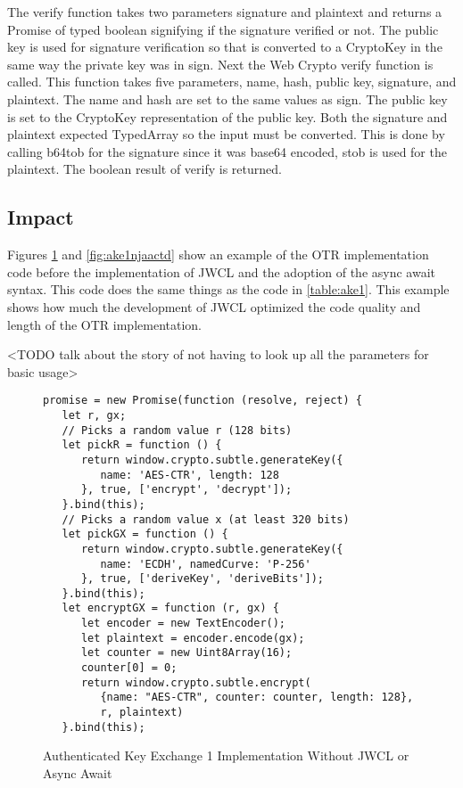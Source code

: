 The verify function takes two parameters signature and plaintext and returns a Promise of typed boolean signifying if the signature verified or not. The public key is used for signature verification so that is converted to a CryptoKey in the same way the private key was in sign. Next the Web Crypto verify function is called. This function takes five parameters, name, hash, public key, signature, and plaintext. The name and hash are set to the same values as sign. The public key is set to the CryptoKey representation of the public key. Both the signature and plaintext expected TypedArray so the input must be converted. This is done by calling b64tob for the signature since it was base64 encoded, stob is used for the plaintext. The boolean result of verify is returned.

\subsection{Impact}

Figures \ref{fig:ake1njaa} and \ref{fig:ake1njaactd} show an example of the OTR implementation code before the implementation of JWCL and the adoption of the async await syntax. This code does the same things as the code in \ref{table:ake1}. This example shows how much the development of JWCL optimized the code quality and length of the OTR implementation. 

<TODO talk about the story of not having to look up all the parameters for basic usage>

\begin{figure}[!htbp]
\centering
 \begin{lstlisting}[basicstyle=\small]
promise = new Promise(function (resolve, reject) {
   let r, gx;
   // Picks a random value r (128 bits)
   let pickR = function () {
      return window.crypto.subtle.generateKey({
         name: 'AES-CTR', length: 128
      }, true, ['encrypt', 'decrypt']);
   }.bind(this);  
   // Picks a random value x (at least 320 bits)
   let pickGX = function () {
      return window.crypto.subtle.generateKey({
         name: 'ECDH', namedCurve: 'P-256'
      }, true, ['deriveKey', 'deriveBits']);
   }.bind(this);
   let encryptGX = function (r, gx) {
      let encoder = new TextEncoder();
      let plaintext = encoder.encode(gx);
      let counter = new Uint8Array(16);
      counter[0] = 0;
      return window.crypto.subtle.encrypt(
         {name: "AES-CTR", counter: counter, length: 128},
         r, plaintext)   
   }.bind(this);
 \end{lstlisting}
  \caption{Authenticated Key Exchange 1 Implementation Without JWCL or Async Await}
\label{fig:ake1njaa}
\end{figure}

